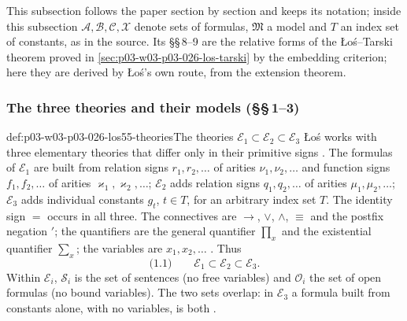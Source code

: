 This subsection follows the paper section by section and keeps its
notation; inside this subsection \(\mathcal A,\mathcal B,\mathcal C,\mathcal X\)
denote sets of formulas, \(\mathfrak M\) a model and \(T\) an index set of
constants, as in the source.  Its \S\S\,8--9 are the relative forms of the
\L o\'s--Tarski theorem proved in
\cref{sec:p03-w03-p03-026-los-tarski} by the embedding criterion; here they
are derived by \L o\'s's own route, from the extension theorem.

\subsubsection{The three theories and their models (\S\S\,1--3)}

\begin{hbconvention}{def:p03-w03-p03-026-los55-theories}{The theories \(\mathcal E_1\subset\mathcal E_2\subset\mathcal E_3\)}
\L o\'s works with three elementary theories that differ only in their
primitive signs \cite[pp.~39--40]{Los1955}.  The formulas of
\(\mathcal E_1\) are built from relation signs \(r_1,r_2,\ldots\) of arities
\(\nu_1,\nu_2,\ldots\) and function signs \(f_1,f_2,\ldots\) of arities
\(\varkappa_1,\varkappa_2,\ldots\); \(\mathcal E_2\) adds relation signs
\(q_1,q_2,\ldots\) of arities \(\mu_1,\mu_2,\ldots\); \(\mathcal E_3\) adds
individual constants \(g_t\), \(t\in T\), for an arbitrary index set \(T\).
The identity sign \(=\) occurs in all three.  The connectives are \(\to\),
\(\lor\), \(\land\), \(\equiv\) and the postfix negation \('\); the
quantifiers are the general quantifier \(\prod_{x}\) and the existential
quantifier \(\sum_{x}\); the variables are \(x_1,x_2,\ldots\)
\cite[p.~40]{Los1955}.  Thus
\begin{equation*}
 \text{(1.1)}\qquad \mathcal E_1\subset\mathcal E_2\subset\mathcal E_3 .
\end{equation*}
Within \(\mathcal E_i\), \(\mathcal S_i\) is the set of sentences (no free
variables) and \(\mathcal O_i\) the set of open formulas (no bound
variables).  The two sets overlap: in \(\mathcal E_3\) a formula built from
constants alone, with no variables, is both \cite[p.~40]{Los1955}.


\end{hbconvention}
